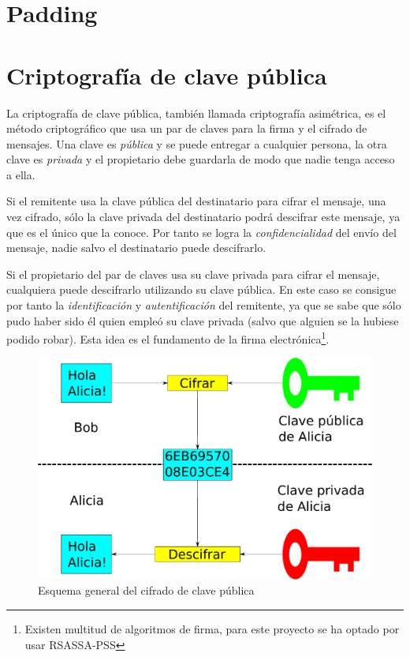
 \section{Padding}


 \section{Criptografía de clave pública}

 La criptografía de clave pública, también llamada criptografía asimétrica, es el método criptográfico que usa un par de claves para la firma y el cifrado de mensajes.
 Una clave es \emph{pública} y se puede entregar a cualquier persona, la otra clave es \emph{privada} y el propietario debe guardarla de modo que nadie tenga acceso a ella.

 Si el remitente usa la clave pública del destinatario para cifrar el mensaje, una vez cifrado, sólo la clave privada del destinatario podrá descifrar este mensaje, ya que es el único que la conoce.
 Por tanto se logra la \emph{confidencialidad} del envío del mensaje, nadie salvo el destinatario puede descifrarlo.

 Si el propietario del par de claves usa su clave privada para cifrar el mensaje, cualquiera puede descifrarlo utilizando su clave pública.
 En este caso se consigue por tanto la \emph{identificación} y \emph{autentificación} del remitente, ya que se sabe que sólo pudo haber sido él quien empleó su clave privada (salvo que alguien se la hubiese podido robar).
 Esta idea es el fundamento de la firma electrónica\footnote{Existen multitud de algoritmos de firma, para este proyecto se ha optado por usar RSASSA-PSS}. \emph{\parencite{Reference5}}

 \begin{figure}[ht]
   \centering
   \includegraphics[scale=0.5]{Figures/PublicKeyEncryption}
   \decoRule
   \caption[Cifrado de clave pública]{Esquema general del cifrado de clave pública}
   \label{fig:PublicKeyEncryption}
 \end{figure}

